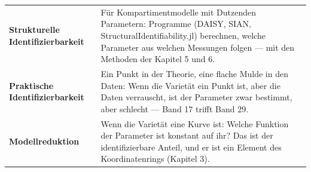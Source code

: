 \begin{forschung}
\begin{center}
{\small
\renewcommand{\arraystretch}{1.45}
\begin{tabular}{@{}P{3.0cm}P{5.2cm}@{}}
\toprule
\textbf{Strukturelle Identifizierbarkeit} & Für Kompartimentmodelle mit Dutzenden Parametern: Programme (DAISY, SIAN, StructuralIdentifiability.jl) berechnen, welche Parameter aus welchen Messungen folgen --- mit den Methoden der Kapitel 5 und 6.\\
\textbf{Praktische Identifizierbarkeit} & Ein Punkt in der Theorie, eine flache Mulde in den Daten: Wenn die Varietät ein Punkt ist, aber die Daten verrauscht, ist der Parameter zwar bestimmt, aber schlecht --- Band 17 trifft Band 29.\\
\textbf{Modellreduktion} & Wenn die Varietät eine Kurve ist: Welche Funktion der Parameter ist konstant auf ihr? Das ist der identifizierbare Anteil, und er ist ein Element des Koordinatenrings (Kapitel 3).\\
\bottomrule
\end{tabular}}
\end{center}

\begin{center}
\begin{minipage}{0.88\textwidth}
\end{minipage}
\end{center}
\end{forschung}

